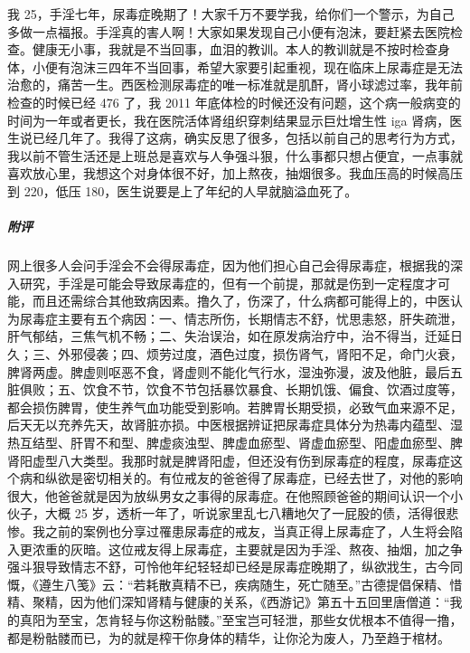 \begin{case}
    我 25，手淫七年，尿毒症晚期了！大家千万不要学我，给你们一个警示，为自己多做一点福报。手淫真的害人啊！大家如果发现自己小便有泡沫，要赶紧去医院检查。健康无小事，我就是不当回事，血泪的教训。本人的教训就是不按时检查身体，小便有泡沫三四年不当回事，希望大家要引起重视，现在临床上尿毒症是无法治愈的，痛苦一生。西医检测尿毒症的唯一标准就是肌酐，肾小球滤过率，我年前检查的时候已经 476 了，我 2011 年底体检的时候还没有问题，这个病一般病变的时间为一年或者更长，我在医院活体肾组织穿刺结果显示巨灶增生性 iga 肾病，医生说已经几年了。我得了这病，确实反思了很多，包括以前自己的思考行为方式，我以前不管生活还是上班总是喜欢与人争强斗狠，什么事都只想占便宜，一点事就喜欢放心里，我想这个对身体很不好，加上熬夜，抽烟很多。我血压高的时候高压到 220，低压 180，医生说要是上了年纪的人早就脑溢血死了。
    \subparagraph{附评} 网上很多人会问手淫会不会得尿毒症，因为他们担心自己会得尿毒症，根据我的深入研究，手淫是可能会导致尿毒症的，但有一个前提，那就是伤到一定程度才可能，而且还需综合其他致病因素。撸久了，伤深了，什么病都可能得上的，中医认为尿毒症主要有五个病因：一、情志所伤，长期情志不舒，忧思恚怒，肝失疏泄，肝气郁结，三焦气机不畅；二、失治误治，如在原发病治疗中，治不得当，迁延日久；三、外邪侵袭；四、烦劳过度，酒色过度，损伤肾气，肾阳不足，命门火衰，脾肾两虚。脾虚则呕恶不食，肾虚则不能化气行水，湿浊弥漫，波及他脏，最后五脏俱败；五、饮食不节，饮食不节包括暴饮暴食、长期饥饿、偏食、饮酒过度等，都会损伤脾胃，使生养气血功能受到影响。若脾胃长期受损，必致气血来源不足，后天无以充养先天，故肾脏亦损。中医根据辨证把尿毒症具体分为热毒内蕴型、湿热互结型、肝胃不和型、脾虚痰浊型、脾虚血瘀型、肾虚血瘀型、阳虚血瘀型、脾肾阳虚型八大类型。我那时就是脾肾阳虚，但还没有伤到尿毒症的程度，尿毒症这个病和纵欲是密切相关的。有位戒友的爸爸得了尿毒症，已经去世了，对他的影响很大，他爸爸就是因为放纵男女之事得的尿毒症。在他照顾爸爸的期间认识一个小伙子，大概 25 岁，透析一年了，听说家里乱七八糟地欠了一屁股的债，活得很悲惨。我之前的案例也分享过罹患尿毒症的戒友，当真正得上尿毒症了，人生将会陷入更浓重的灰暗。这位戒友得上尿毒症，主要就是因为手淫、熬夜、抽烟，加之争强斗狠导致情志不舒，可怜他年纪轻轻却已经是尿毒症晚期了，纵欲戕生，古今同慨，《遵生八笺》云：“若耗散真精不已，疾病随生，死亡随至。”古德提倡保精、惜精、聚精，因为他们深知肾精与健康的关系，《西游记》第五十五回里唐僧道：“我的真阳为至宝，怎肯轻与你这粉骷髅。”至宝岂可轻泄，那些女优根本不值得一撸，都是粉骷髅而已，为的就是榨干你身体的精华，让你沦为废人，乃至趋于棺材。
\end{case}

